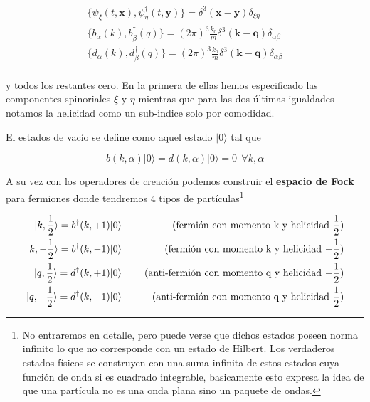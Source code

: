 \documentclass{article}
\numberwithin{equation}{section}
\begin{document}
\begin{equation}\label{key}
\begin{aligned}
\{\psi_{\xi}(t,\mathbf{x}),\psi_{\eta}^{\dagger}(t,\mathbf{y})\} = \delta^3(\mathbf{x}-\mathbf{y})\delta_{\xi \eta}\\
\{b_{\alpha}(k),b_{\beta}^{\dagger}(q)\} = (2\pi)^3\frac{k_0}{m}\delta^3(\mathbf{k}-\mathbf{q})\delta_{\alpha \beta}\\
\{d_{\alpha}(k),d_{\beta}^{\dagger}(q)\} = (2\pi)^3\frac{k_0}{m}\delta^3(\mathbf{k}-\mathbf{q})\delta_{\alpha \beta}\\
\end{aligned}
\end{equation}

y todos los restantes cero. En la primera de ellas hemos especificado las componentes spinoriales $ \xi $ y $ \eta $ mientras que para las dos últimas igualdades notamos la helicidad como un sub-indice solo por comodidad.

El estados de vacío se define como aquel estado $ |0\rangle $ tal que 

\begin{equation}\label{key}
b(k,\alpha)|0\rangle = d(k,\alpha)|0\rangle=0 \ \ \forall k,\alpha
\end{equation}

A su vez con los operadores de creación podemos construir el \textbf{espacio de Fock} para fermiones donde tendremos 4 tipos de partículas\footnote{ No entraremos en detalle, pero puede verse que dichos estados poseen norma infinito lo que no corresponde con un estado de Hilbert. Los verdaderos estados físicos se construyen con una suma infinita de estos estados cuya función de onda si es cuadrado integrable, basicamente esto expresa la idea de que una partícula no es una onda plana sino un paquete de ondas.}

\begin{equation}\label{key}
\left.\begin{aligned}
|k,\frac{1}{2}\rangle = b^{\dagger}(k,+1)|0\rangle\\
|k,-\frac{1}{2}\rangle = b^{\dagger}(k,-1)|0\rangle\\
|q,\frac{1}{2}\rangle = d^{\dagger}(k,+1)|0\rangle\\
|q,-\frac{1}{2}\rangle = d^{\dagger}(k,-1)|0\rangle
\end{aligned}
\right.\begin{aligned}
\qquad \text{(fermión con momento k y helicidad $ \frac{1}{2} $)}\\
\qquad \text{(fermión con momento k y helicidad $ -\frac{1}{2} $)}\\
\qquad \text{(anti-fermión con momento q y helicidad $ -\frac{1}{2} $)}\\
\qquad \text{(anti-fermión con momento q y helicidad $ \frac{1}{2} $)}
\end{aligned}
\end{equation}  
\end{document}
